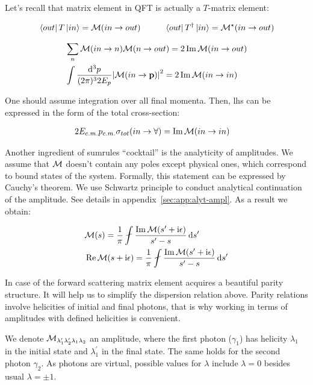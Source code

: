 Let's recall that matrix element in QFT is actually a $T$-matrix element:

\begin{align}
    & \bra{out} T \ket{in} = \mathcal{M}(in \rightarrow out) \qquad &\bra{out} T^\dag \ket{in} = \mathcal{M}^\star(in \rightarrow out)
\end{align}

\begin{align}
        & \sum_{n} \mathcal{M}(in \rightarrow n)  \mathcal{M}(n \rightarrow out) = 2 \Im \mathcal{M}(in \rightarrow out) \\
        & \int \frac{\dd[3]{p}}{(2 \pi)^3 2 E_{p}} \abs{\mathcal{M}(in \rightarrow \mathbf{p})}^2 = 2 \Im \mathcal{M}(in \rightarrow in)
\end{align}

One should assume integration over all final momenta. Then, lhs can be expressed in the form of the total cross-section:

\begin{align}
    & 2 E_{c.m.} p_{c.m.} \sigma_{tot}(in \rightarrow \forall) =  \Im \mathcal{M}(in \rightarrow in) \label{eq:optical-th}
\end{align}

Another ingredient of sumrules ``cocktail'' is the analyticity of amplitudes. We assume that $\mathcal{M}$ doesn't contain any poles except physical ones, which correspond to bound states of the system. Formally, this statement can be expressed by Cauchy's theorem. We use Schwartz principle to conduct analytical continuation of the amplitude. See details in appendix~\cref{sec:app:alyt-ampl}. As a result we obtain:

\begin{align}
    & \Mcal(s) = \frac{1}{\pi} \fint \frac{\Im \Mcal(s^\prime + \ii \epsilon)}{s^\prime - s} \dd{s^\prime} \\
    & \Re \Mcal(s + \ii \epsilon) = \frac{1}{\pi} \fint \frac{\Im \Mcal(s^\prime + \ii \epsilon)}{s^\prime - s} \dd{s^\prime} \label{eq:disp-rel-gen}
\end{align}

In case of the forward scattering matrix element acquires a beautiful parity structure. It will help us to simplify the dispersion relation above. Parity relations involve helicities of initial and final photons, that is why working in terms of amplitudes with defined helicities is convenient.

We denote $\mathcal{M}_{\lambda^\prime_1 \lambda^\prime_2 \lambda_1 \lambda_2}$ an amplitude, where the first photon ($\gamma_1$) has helicity $\lambda_1$ in the initial state and $\lambda_1^\prime$ in the final state. The same holds for the second photon $\gamma_2$. As photons are virtual, possible values for $\lambda$ include $\lambda=0$ besides usual $\lambda=\pm1$.

